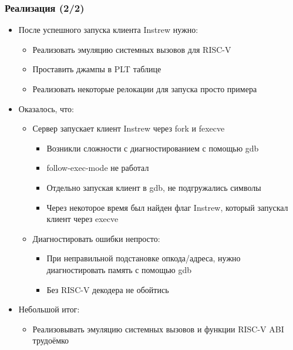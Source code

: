 \documentclass{beamer}
\begin{document}
\begin{frame}[fragile]
  \frametitle{Реализация (2/2)}
  \begin{itemize}
    \item После успешного запуска клиента Instrew нужно:
          \begin{itemize}
            \item Реализовать эмуляцию системных вызовов для RISC-V
            \item Проставить джампы в PLT таблице
            \item Реализовать некоторые релокации для запуска просто примера
          \end{itemize}
    \item Оказалось, что:
          \begin{itemize}
            \item Сервер запускает клиент Instrew через fork и fexecve
                  \begin{itemize}
                    \item Возникли сложности с диагностированием с помощью gdb
                    \item follow-exec-mode не работал
                    \item Отдельно запуская клиент в gdb, не подгружались символы
                    \item Через некоторое время был найден флаг Instrew, который запускал клиент через execve
                  \end{itemize}
            \item Диагностировать ошибки непросто:
                  \begin{itemize}
                    \item При неправильной подстановке опкода/адреса, нужно диагностировать память с помощью gdb
                    \item Без RISC-V декодера не обойтись
                  \end{itemize}
          \end{itemize}
    \item Небольшой итог:
          \begin{itemize}
            \item Реализовывать эмуляцию системных вызовов и функции RISC-V ABI трудоёмко
          \end{itemize}
  \end{itemize}
\end{frame}
\end{document}
